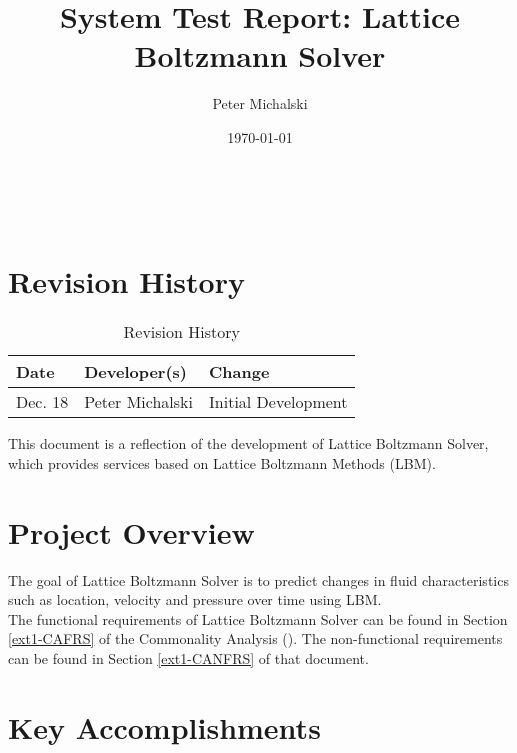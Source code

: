 \documentclass{article}
\newcommand{\myprogname}{Lattice Boltzmann Solver}
\begin{document}
	
\title{System Test Report: \myprogname} 
\author{Peter Michalski}
\date{\today}

\maketitle


~\newpage

\section{Revision History}

\begin{table}[hp]
\caption{Revision History} \label{TblRevisionHistory}
\begin{tabularx}{\textwidth}{llX}
\toprule
\textbf{Date} & \textbf{Developer(s)} & \textbf{Change}\\
\midrule
Dec. 18 & Peter Michalski & Initial Development\\
\bottomrule
\end{tabularx}
\end{table}

\newpage

\maketitle

This document is a reflection of the development of {\myprogname}, which provides services based on Lattice Boltzmann Methods (LBM).

\section{Project Overview}

The goal of {\myprogname} is to predict changes in fluid characteristics such as location, velocity and pressure over time using LBM.\\

\noindent The functional requirements of {\myprogname} can be found in Section \ref{ext1-CAFRS} of the Commonality Analysis (\citet{LBM_CA_PM}). The non-functional requirements can be found in Section \ref{ext1-CANFRS} of that document.


\section{Key Accomplishments}
\end{document}
